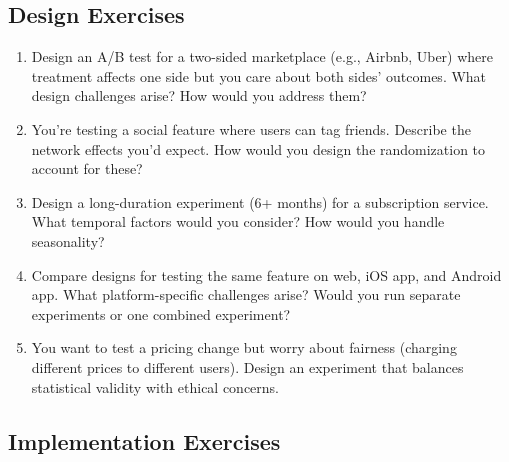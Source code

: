 \subsection{Design Exercises}

\begin{enumerate}
    \item Design an A/B test for a two-sided marketplace (e.g., Airbnb, Uber) where treatment affects one side but you care about both sides' outcomes. What design challenges arise? How would you address them?

    \item You're testing a social feature where users can tag friends. Describe the network effects you'd expect. How would you design the randomization to account for these?

    \item Design a long-duration experiment (6+ months) for a subscription service. What temporal factors would you consider? How would you handle seasonality?

    \item Compare designs for testing the same feature on web, iOS app, and Android app. What platform-specific challenges arise? Would you run separate experiments or one combined experiment?

    \item You want to test a pricing change but worry about fairness (charging different prices to different users). Design an experiment that balances statistical validity with ethical concerns.
\end{enumerate}

\subsection{Implementation Exercises}

